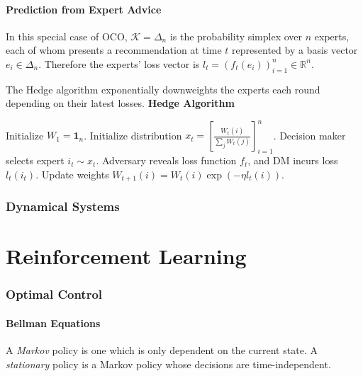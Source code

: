 \documentclass[11pt, letterpaper]{article}
\begin{document}
\subsection{Prediction from Expert Advice}

\begin{concept}
    In this special case of OCO, \(\mathcal{K} = \Delta_n\) is the probability simplex over \(n\) experts, each of whom presents a recommendation at time \(t\) represented by a basis vector \(e_i \in \Delta_n\). Therefore the experts' loss vector is \(l_t = (f_t(e_i))_{i=1}^n \in \mathbb{R}^n\).
\end{concept}

\begin{concept}
    The Hedge algorithm exponentially downweights the experts each round depending on their latest losses. 
    \algline
    \textbf{Hedge Algorithm}
    \begin{algorithmic}[1]
        \State Initialize \(W_1 = \mathbf{1}_n\).
        \State Initialize distribution \(x_t = \left[\frac{W_t(i)}{\sum_j W_t(j)}\right]_{i=1}^n\).
            \State Decision maker selects expert \(i_t \sim x_t\).
            \State Adversary reveals loss function \(f_t\), and DM incurs loss \(l_t(i_t)\). 
            \State Update weights \(W_{t+1}(i) = W_t(i) \exp(-\eta l_t(i))\). 
        \EndFor
    \end{algorithmic}
    \algline
\end{concept}

\section{Dynamical Systems}

\newpage
\part{Reinforcement Learning}

\section{Optimal Control}

\subsection{Bellman Equations}

\begin{concept}
    A \textit{Markov} policy is one which is only dependent on the current state. A \textit{stationary} policy is a Markov policy whose decisions are time-independent. 
\end{concept}
\end{document}
